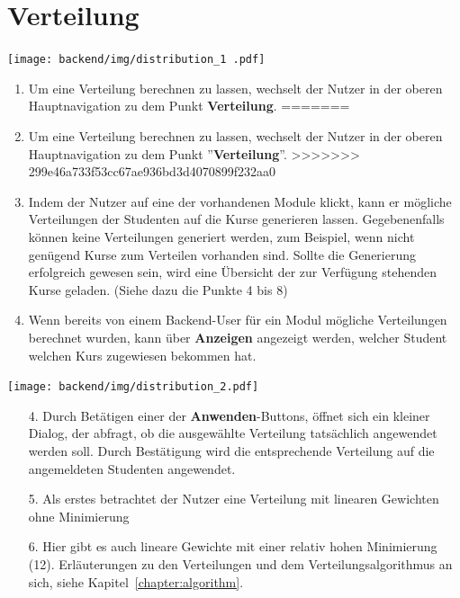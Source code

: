   
  \section{Verteilung}
  \label{section:distribution}
  
  \texttt{[image: backend/img/distribution\_1 .pdf]}
  
  \begin{enumerate}
<<<<<<< HEAD
   \item Um eine Verteilung berechnen zu lassen, wechselt der Nutzer in der oberen Hauptnavigation zu dem Punkt \textbf{Verteilung}.
=======
   \item Um eine Verteilung berechnen zu lassen, wechselt der Nutzer in der oberen Hauptnavigation zu dem Punkt ''\textbf{Verteilung}''.
>>>>>>> 299e46a733f53cc67ae936bd3d4070899f232aa0
   \item Indem der Nutzer auf eine der vorhandenen Module klickt, kann er mögliche Verteilungen der Studenten auf die Kurse generieren lassen.
	 Gegebenenfalls können keine Verteilungen generiert werden, zum Beispiel, wenn nicht genügend Kurse zum Verteilen vorhanden sind.
	 Sollte die Generierung erfolgreich gewesen sein, wird eine Übersicht der zur Verfügung stehenden Kurse geladen. 
	 (Siehe dazu die Punkte 4 bis 8)
   \item Wenn bereits von einem Backend-User für ein Modul mögliche Verteilungen berechnet wurden, kann über \textbf{Anzeigen} angezeigt werden, welcher Student welchen Kurs zugewiesen bekommen hat.
  \end{enumerate}
  
  \texttt{[image: backend/img/distribution\_2.pdf]}
  
  \begin{enumerate}
   \item[4.] Durch Betätigen einer der \textbf{Anwenden}-Buttons, öffnet sich ein kleiner Dialog, der abfragt, ob die ausgewählte Verteilung 
	    tatsächlich angewendet werden soll. Durch Bestätigung wird die entsprechende Verteilung auf die angemeldeten Studenten angewendet.  
   \item[5.] Als erstes betrachtet der Nutzer eine Verteilung mit linearen Gewichten ohne Minimierung
   \item[6.] Hier gibt es auch lineare Gewichte mit einer relativ hohen Minimierung (12). 
	     Erläuterungen zu den Verteilungen und dem Verteilungsalgorithmus an sich, siehe Kapitel~\ref{chapter:algorithm}. 
  \end{enumerate}

